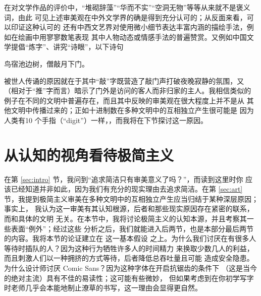 在对文学作品的评价中，“堆砌辞藻”“华而不实”“空洞无物”等等从来就不是褒义词，由此
可见上述审美观在中外文学界的确是得到充分认可的；从反面来看，可以印证这种认可的
还有中西文艺界对使用微小细节表达丰富内涵的描绘手法，例如在绘画中用寥寥数笔表现
其中人物动态或情感手法的普遍赞赏。又例如中国文学提倡“炼字”、讲究“诗眼”，以下诗句
\begin{quoting}
	鸟宿池边树，僧敲月下门。
\end{quoting}
被世人传诵的原因就在于其中“敲”字既营造了敲门声打破夜晚寂静的氛围，又
（相对于“推”字而言）暗示了门外是访问的客人而非归家的主人。我相信类似的
例子在不同的文明中普遍存在，而且其中反映的审美观在很大程度上并不是从
其他文明中传播过来的；正如十进制数在多种文明中的互相独立产生很可能是
因为人类有10 个手指（“digit”）一样，，而我将在下节探讨这一原因。

\section{从认知的视角看待极简主义}\label{sec:cognitive}

在第 \ref{sec:intro} 节，我问到“追求简洁只有审美意义了吗？”，而读到这里时你
应该已经知道并非如此，因为我们有充分的现实理由去追求简洁。在第 \ref{sec:art}
节，我提到极简主义审美在多种文明中的互相独立产生应当归结于某种深层原因；事实上，
我认为这一审美有其认知根源，后者和那些现实原因存在紧密的联系，而和具体的文明
无关。在本节中，我将讨论极简主义的认知本源，并且考察其一些表面“例外”；经过这些
分析之后，我们就能进入后两节，也是本部分最后两节的内容。我将本节的论证建立在%
这一基本假设
之上。为什么我们讨厌在有很多人等待时插队的人？因为这种行为牺牲许多人的时间精力
来换取少数几人的利益，而且刺激人们以一种拥挤的方式等待，后者降低总吞吐量且可能
造成安全隐患。为什么设计师讨厌 Comic Sans？因为这种字体在开启抗锯齿的条件下
（这是当今的绝对主流）具有不佳的易读性；这可能有些微妙，
但如果考虑到在你初学写字时老师几乎会本能地制止潦草的书写，这一理由会显得更自然。

